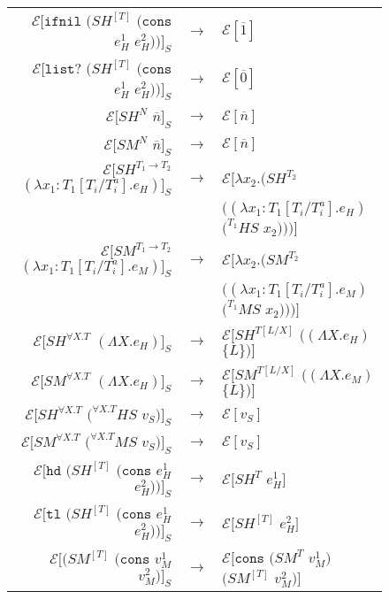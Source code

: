 \begin{figure}[p]
\centering
\begin{tabular}{rcl}
$\mathscr{E}[\mathtt{ifnil}$ $(SH^{[T]}$ $(\mathtt{cons}$ $e_{H}^{1}$ $e_{H}^{2}))]_{S}$ & $\rightarrow$ & $\mathscr{E}[\overline{1}]$ \\
$\mathscr{E}[\mathtt{list?}$ $(SH^{[T]}$ $(\mathtt{cons}$ $e_{H}^{1}$ $e_{H}^{2}))]_{S}$ & $\rightarrow$ & $\mathscr{E}[\overline{0}]$ \\
$\mathscr{E}[SH^{N}$ $\overline{n}]_{S}$ & $\rightarrow$ & $\mathscr{E}[\overline{n}]$ \\
$\mathscr{E}[SM^{N}$ $\overline{n}]_{S}$ & $\rightarrow$ & $\mathscr{E}[\overline{n}]$ \\
$\mathscr{E}[SH^{T_{1}\rightarrow T_{2}}$ $(\lambda x_{1}:T_{1}[T_{i}/T_{i}^{a}].e_{H})]_{S}$ & $\rightarrow$ & $\mathscr{E}[\lambda x_{2}.(SH^{T_{2}}$ \\
&& $((\lambda x_{1}:T_{1}[T_{i}/T_{i}^{a}].e_{H})$ $(^{T_{1}}HS$ $x_{2})))]$ \\
$\mathscr{E}[SM^{T_{1}\rightarrow T_{2}}$ $(\lambda x_{1}:T_{1}[T_{i}/T_{i}^{a}].e_{M})]_{S}$ & $\rightarrow$ & $\mathscr{E}[\lambda x_{2}.(SM^{T_{2}}$ \\
&& $((\lambda x_{1}:T_{1}[T_{i}/T_{i}^{a}].e_{M})$ $(^{T_{1}}MS$ $x_{2})))]$ \\
$\mathscr{E}[SH^{\forall X.T}$ $(\Lambda X.e_{H})]_{S}$ & $\rightarrow$ & $\mathscr{E}[SH^{T[L/X]}$ $((\Lambda X.e_{H})$ $\lbrace L\rbrace)]$ \\
$\mathscr{E}[SM^{\forall X.T}$ $(\Lambda X.e_{H})]_{S}$ & $\rightarrow$ & $\mathscr{E}[SM^{T[L/X]}$ $((\Lambda X.e_{M})$ $\lbrace L\rbrace)]$ \\
$\mathscr{E}[SH^{\forall X.T}$ $(^{\forall X.T}HS$ $v_{S})]_{S}$ & $\rightarrow$ & $\mathscr{E}[v_{S}]$ \\
$\mathscr{E}[SM^{\forall X.T}$ $(^{\forall X.T}MS$ $v_{S})]_{S}$ & $\rightarrow$ & $\mathscr{E}[v_{S}]$ \\
$\mathscr{E}[\mathtt{hd}$ $(SH^{[T]}$ $(\mathtt{cons}$ $e_{H}^{1}$ $e_{H}^{2}))]_{S}$ & $\rightarrow$ & $\mathscr{E}[SH^{T}$ $e_{H}^{1}]$ \\
$\mathscr{E}[\mathtt{tl}$ $(SH^{[T]}$ $(\mathtt{cons}$ $e_{H}^{1}$ $e_{H}^{2}))]_{S}$ & $\rightarrow$ & $\mathscr{E}[SH^{[T]}$ $e_{H}^{2}]$ \\
$\mathscr{E}[(SM^{[T]}$ $(\mathtt{cons}$ $v_{M}^{1}$ $v_{M}^{2})]_{S}$ & $\rightarrow$ & $\mathscr{E}[\mathtt{cons}$ $(SM^{T}$ $v_{M}^{1})$ $(SM^{[T]}$ $v_{M}^{2})]$ \\

\end{tabular}
\end{figure}
